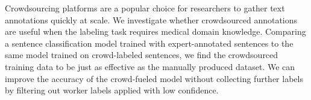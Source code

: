 Crowdsourcing platforms are a popular choice for researchers to gather text annotations quickly at scale. We investigate whether crowdsourced annotations are useful when the labeling task requires medical domain knowledge. Comparing a sentence classification model trained with expert-annotated sentences to the same model trained on crowd-labeled sentences, we find the crowdsourced training data to be just as effective as the manually produced dataset. We can improve the accuracy of the crowd-fueled model without collecting further labels by filtering out worker labels applied with low confidence.
